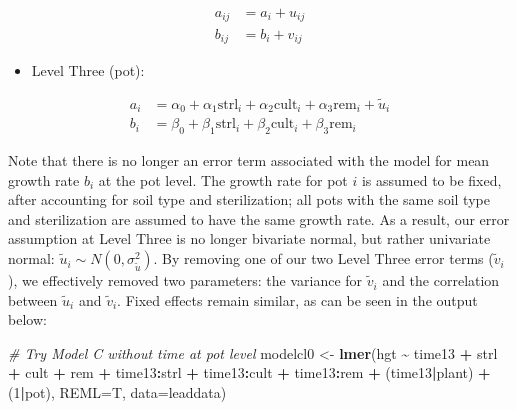 \documentclass[
]{krantz}
\newenvironment{Shaded}{\begin{snugshade}}{\end{snugshade}}
\newcommand{\AttributeTok}[1]{\textcolor[rgb]{0.27,0.27,0.27}{#1}}
\newcommand{\CommentTok}[1]{\textcolor[rgb]{0.37,0.37,0.37}{\textit{#1}}}
\newcommand{\DecValTok}[1]{\textcolor[rgb]{0.06,0.06,0.06}{#1}}
\newcommand{\FunctionTok}[1]{\textcolor[rgb]{0.27,0.27,0.27}{\textbf{#1}}}
\newcommand{\NormalTok}[1]{#1}
\newcommand{\OtherTok}[1]{\textcolor[rgb]{0.37,0.37,0.37}{#1}}
\newcommand{\SpecialCharTok}[1]{\textcolor[rgb]{0.43,0.43,0.43}{\textbf{#1}}}
\providecommand{\tightlist}{%
  \setlength{\itemsep}{0pt}\setlength{\parskip}{0pt}}
\begin{document}
\begin{align*}
a_{ij} & = a_{i}+u_{ij} \\
b_{ij} & = b_{i}+v_{ij}
\end{align*}

\begin{itemize}
\tightlist
\item
  Level Three (pot):
\end{itemize}

\begin{align*}
a_{i} & = \alpha_{0}+\alpha_{1}\textrm{strl}_{i}+\alpha_{2}\textrm{cult}_{i}+\alpha_{3}\textrm{rem}_{i}+\tilde{u}_{i} \\
b_{i} & = \beta_{0}+\beta_{1}\textrm{strl}_{i}+\beta_{2}\textrm{cult}_{i}+\beta_{3}\textrm{rem}_{i}
\end{align*}

Note that there is no longer an error term associated with the model for mean growth rate \(b_{i}\) at the pot level. The growth rate for pot \(i\) is assumed to be fixed, after accounting for soil type and sterilization; all pots with the same soil type and sterilization are assumed to have the same growth rate. As a result, our error assumption at Level Three is no longer bivariate normal, but rather univariate normal: \(\tilde{u}_{i}\sim N(0,\sigma_{\tilde{u}}^{2})\). By removing one of our two Level Three error terms (\(\tilde{v}_{i}\)), we effectively removed two parameters: the variance for \(\tilde{v}_{i}\) and the correlation between \(\tilde{u}_{i}\) and \(\tilde{v}_{i}\). Fixed effects remain similar, as can be seen in the output below:

\begin{Shaded}
\begin{Highlighting}[]
\CommentTok{\# Try Model C without time at pot level}
\NormalTok{modelcl0 }\OtherTok{\textless{}{-}} \FunctionTok{lmer}\NormalTok{(hgt }\SpecialCharTok{\textasciitilde{}}\NormalTok{ time13 }\SpecialCharTok{+}\NormalTok{ strl }\SpecialCharTok{+}\NormalTok{ cult }\SpecialCharTok{+}\NormalTok{ rem }\SpecialCharTok{+} 
\NormalTok{    time13}\SpecialCharTok{:}\NormalTok{strl }\SpecialCharTok{+}\NormalTok{ time13}\SpecialCharTok{:}\NormalTok{cult }\SpecialCharTok{+}\NormalTok{ time13}\SpecialCharTok{:}\NormalTok{rem }\SpecialCharTok{+}\NormalTok{ (time13}\SpecialCharTok{|}\NormalTok{plant) }\SpecialCharTok{+}
\NormalTok{    (}\DecValTok{1}\SpecialCharTok{|}\NormalTok{pot), }\AttributeTok{REML=}\NormalTok{T, }\AttributeTok{data=}\NormalTok{leaddata)}
\end{Highlighting}
\end{Shaded}
\end{document}
